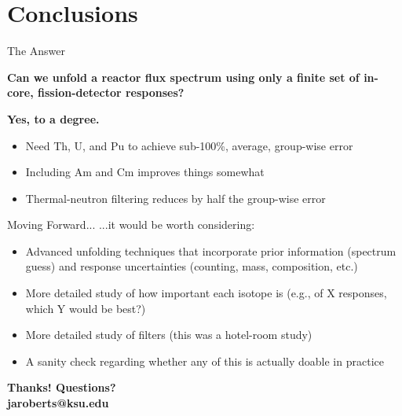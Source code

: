 \documentclass[fleqn]{beamer}
\begin{document}
    \section{Conclusions}
    
    \begin{frame}{The Answer}
       \begin{center}
         {\bf\Large Can we unfold a reactor flux spectrum using only a 
         finite set of in-core, fission-detector responses?}
       \end{center}
       \vfill 
       \pause
       {\bf\Large Yes, to a degree.}
       \begin{itemize}
        \pause
        \item Need Th, U, and Pu to achieve sub-100\%, average, group-wise error
        \pause
        \item Including Am and Cm improves things somewhat
        \pause
        \item Thermal-neutron filtering reduces by half the group-wise error
       \end{itemize}

    \end{frame}
    
        
    \begin{frame}{Moving Forward...}
       ...it would be worth considering:
       \begin{itemize}
        \pause
        \item Advanced unfolding techniques that incorporate prior information (spectrum guess)
              and response uncertainties (counting, mass, composition, etc.)
        \pause
        \item More detailed study of how important each isotope is (e.g., of X responses, which Y would be best?)
        \pause
        \item More detailed study of filters (this was a hotel-room study)
        \pause 
        \item A sanity check regarding whether any of this is actually doable in practice
       \end{itemize}
       \vfill 
       \pause 
       \begin{center}
        {\bf Thanks!  Questions? \\
        jaroberts@ksu.edu}
       \end{center}


    \end{frame}
    
\end{document}

